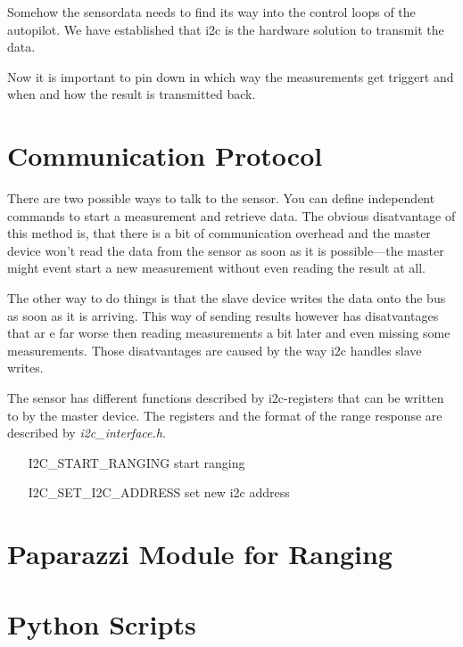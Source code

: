 
Somehow the sensordata needs to find its way into the control loops of the autopilot.
We have established that i2c is the hardware solution to transmit the data.

Now it is important to pin down in which way the measurements get triggert and when and how the result is transmitted back.

\section{Communication Protocol}

There are two possible ways to talk to the sensor.
You can define independent commands to start a measurement and retrieve data.
The obvious disatvantage of this method is, that there is a bit of communication overhead and the master device won't read the data from the sensor as soon as it is possible—the master might event start a new measurement without even reading the result at all.

The other way to do things is that the slave device writes the data onto the bus as soon as it is arriving.
This way of sending results however has disatvantages that ar e far worse then reading measurements a bit later and even missing some measurements.
Those disatvantages are caused by the way i2c handles slave writes.

The sensor has different functions described by i2c-registers that can be written to by the master device.
The registers and the format of the range response are described by \emph{i2c\_interface.h}.

\begin{itemize}
	\item[I2C\_START\_RANGING] start ranging
	\item[I2C\_SET\_I2C\_ADDRESS] set new i2c address
\end{itemize}


\section{Paparazzi Module for Ranging}


\section{Python Scripts}

